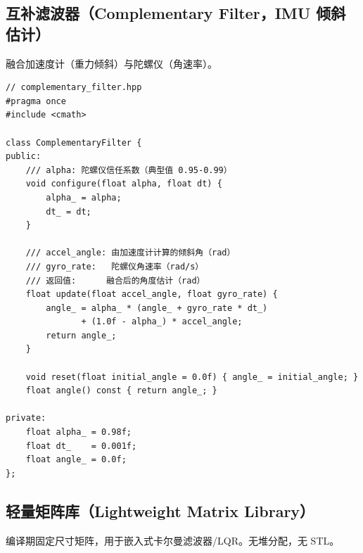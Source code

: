 \subsection{互补滤波器（Complementary Filter，IMU 倾斜估计）}

融合加速度计（重力倾斜）与陀螺仪（角速率）。

\begin{verbatim}
// complementary_filter.hpp
#pragma once
#include <cmath>

class ComplementaryFilter {
public:
    /// alpha: 陀螺仪信任系数（典型值 0.95-0.99）
    void configure(float alpha, float dt) {
        alpha_ = alpha;
        dt_ = dt;
    }

    /// accel_angle: 由加速度计计算的倾斜角（rad）
    /// gyro_rate:   陀螺仪角速率（rad/s）
    /// 返回值:      融合后的角度估计（rad）
    float update(float accel_angle, float gyro_rate) {
        angle_ = alpha_ * (angle_ + gyro_rate * dt_)
               + (1.0f - alpha_) * accel_angle;
        return angle_;
    }

    void reset(float initial_angle = 0.0f) { angle_ = initial_angle; }
    float angle() const { return angle_; }

private:
    float alpha_ = 0.98f;
    float dt_    = 0.001f;
    float angle_ = 0.0f;
};
\end{verbatim}

\subsection{轻量矩阵库（Lightweight Matrix Library）}

编译期固定尺寸矩阵，用于嵌入式卡尔曼滤波器/LQR。无堆分配，无 STL。

